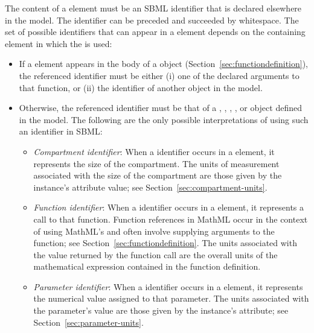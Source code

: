 The content of a  element must be an SBML identifier
that is declared elsewhere in the model.  The identifier can be
preceded and succeeded by whitespace. The set of possible
identifiers that can appear in a  element depends on the
containing element in which the  is used:
\begin{itemize}
  
\item If a  element appears in the body of a
  \FunctionDefinition object
  (Section~\ref{sec:functiondefinition}), the referenced
  identifier must be either (i) one of the declared arguments to
  that function, or (ii) the identifier of another
  \FunctionDefinition object in the model.
  
\item Otherwise, the referenced identifier must be that of a
  \Compartment, \FunctionDefinition, \Parameter, \Reaction,
  \Species or \SpeciesReference object defined in the model.  The
  following are the only possible interpretations of using such an
  identifier in SBML:
  \begin{itemize}

  \item \emph{Compartment identifier}: When a \Compartment
    identifier occurs in a  element, it represents the
    size of the compartment.  The units of measurement associated
    with the size of the compartment are those given by the
    \Compartment instance's  attribute value; see
    Section~\ref{sec:compartment-units}.
    
  \item \emph{Function identifier}: When a \FunctionDefinition
    identifier occurs in a  element, it represents a
    call to that function.  Function references in MathML occur in
    the context of using MathML's  and often involve
    supplying arguments to the function; see
    Section~\ref{sec:functiondefinition}.  The units associated
    with the value returned by the function call are the overall
    units of the mathematical expression contained in the function
    definition.
    
  \item \emph{Parameter identifier}: When a \Parameter identifier
    occurs in a  element, it represents the numerical
    value assigned to that parameter.  The units associated with
    the parameter's value are those given by the
      \Parameter instance's  attribute; see
    Section~\ref{sec:parameter-units}.


\end{itemize}
\end{itemize}
